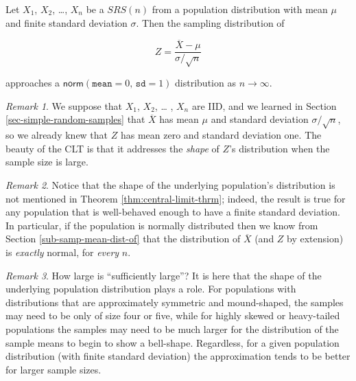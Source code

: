 \documentclass[]{book}
\numberwithin{equation}{chapter}
\numberwithin{figure}{chapter}
\theoremstyle{plain}
\theoremstyle{definition}
\theoremstyle{remark}
\theoremstyle{definition}
\theoremstyle{definition}
\theoremstyle{remark}
\newtheorem*{remark}{Remark}
\let\BeginKnitrBlock\begin \let\EndKnitrBlock\end
\begin{document}
\bigskip

\BeginKnitrBlock{theorem}[Central Limit Theorem]
\protect\hypertarget{thm:central-limit-theorem}{}{\label{thm:central-limit-theorem}
\iffalse (Central Limit Theorem) \fi }Let \(X_{1}\), \(X_{2}\),
\ldots{}, \(X_{n}\) be a \(SRS(n)\) from a population distribution with
mean \(\mu\) and finite standard deviation \(\sigma\). Then the sampling
distribution of

\begin{equation}
Z=\frac{\overline{X}-\mu}{\sigma/\sqrt{n}}
\end{equation}

approaches a \(\mathsf{norm}(\mathtt{mean}=0,\,\mathtt{sd}=1)\)
distribution as \(n\to\infty\).
\EndKnitrBlock{theorem}

\bigskip

\begin{remark}
We suppose that \(X_{1}\), \(X_{2}\), \ldots{} , \(X_{n}\) are IID, and
we learned in Section \ref{sec-simple-random-samples} that
\(\overline{X}\) has mean \(\mu\) and standard deviation
\(\sigma/\sqrt{n}\), so we already knew that \(Z\) has mean zero and
standard deviation one. The beauty of the CLT is that it addresses the
\emph{shape} of \(Z\)'s distribution when the sample size is large.
\end{remark}

\bigskip

\begin{remark}
Notice that the shape of the underlying population's distribution is not
mentioned in Theorem \ref{thm:central-limit-thrm}; indeed, the result is
true for any population that is well-behaved enough to have a finite
standard deviation. In particular, if the population is normally
distributed then we know from Section \ref{sub-samp-mean-dist-of} that
the distribution of \(\overline{X}\) (and \(Z\) by extension) is
\emph{exactly} normal, for \emph{every} \(n\).
\end{remark}

\bigskip

\begin{remark}
How large is ``sufficiently large''? It is here that the shape of the
underlying population distribution plays a role. For populations with
distributions that are approximately symmetric and mound-shaped, the
samples may need to be only of size four or five, while for highly
skewed or heavy-tailed populations the samples may need to be much
larger for the distribution of the sample means to begin to show a
bell-shape. Regardless, for a given population distribution (with finite
standard deviation) the approximation tends to be better for larger
sample sizes.
\end{remark}
\end{document}
